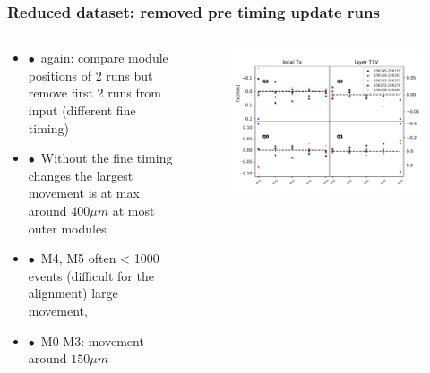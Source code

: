 \documentclass[aspectratio=1610, 12pt]{beamer}
\begin{document}
\begin{frame}\frametitle{Reduced dataset: removed pre timing update runs}
  \begin{columns}
    \begin{column}[c]{0.48\textwidth}
      \begin{itemize}
        \item $\bullet$\, again: compare module positions of 2 runs but remove first 2 runs from input (different fine timing)
        \item $\bullet$\, Without the fine timing changes the largest movement is at max around $400 \mu m$ at most outer modules
        \item $\bullet$\, M4, M5 often < 1000 events (difficult for the alignment) \to large movement,
        \item $\bullet$\, M0-M3: movement around $150 \mu m$
      \end{itemize}
    \end{column}
      \begin{column}[c]{0.48\textwidth}
        \begin{figure}
          \includegraphics[width=\textwidth]{plots/stability_plots/diff_reduced_Tx_T1V_Tx.pdf}
        \end{figure}
      \end{column}
  \end{columns}
\end{frame}
\end{document}
